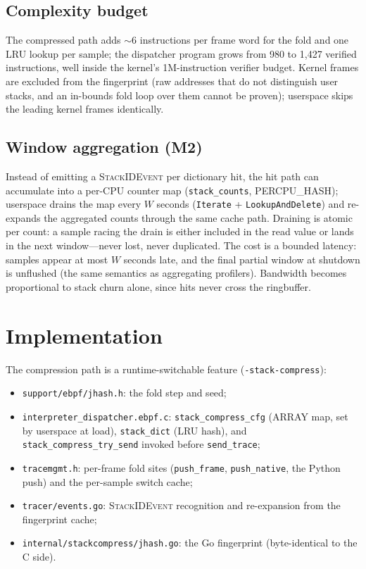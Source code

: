 \documentclass[letterpaper,twocolumn,10pt]{article}
\begin{document}
\subsection{Complexity budget}
The compressed path adds $\sim$6 instructions per frame word for the fold
and one LRU lookup per sample; the dispatcher program grows from 980 to
1{,}427 verified instructions, well inside the kernel's 1M-instruction
verifier budget. Kernel frames are excluded from the fingerprint (raw
addresses that do not distinguish user stacks, and an in-bounds fold loop
over them cannot be proven); userspace skips the leading kernel frames
identically.

\subsection{Window aggregation (M2)}
Instead of emitting a \textsc{StackIDEvent} per dictionary hit, the hit
path can accumulate into a per-CPU counter map
(\texttt{stack\_counts}, PERCPU\_HASH); userspace drains the map every
$W$ seconds (\texttt{Iterate} + \texttt{LookupAndDelete}) and re-expands
the aggregated counts through the same cache path. Draining is atomic per
count: a sample racing the drain is either included in the read value or
lands in the next window---never lost, never duplicated. The cost is a
bounded latency: samples appear at most $W$ seconds late, and the final
partial window at shutdown is unflushed (the same semantics as aggregating
profilers). Bandwidth becomes proportional to stack churn alone, since
hits never cross the ringbuffer.

\section{Implementation}
\label{sec:impl}
The compression path is a runtime-switchable feature
(\texttt{-stack-compress}):
\begin{itemize}
\item \texttt{support/ebpf/jhash.h}: the fold step and seed;
\item \texttt{interpreter\_dispatcher.ebpf.c}: \texttt{stack\_compress\_cfg}
(ARRAY map, set by userspace at load), \texttt{stack\_dict} (LRU hash), and
\texttt{stack\_compress\_try\_send} invoked before \texttt{send\_trace};
\item \texttt{tracemgmt.h}: per-frame fold sites (\texttt{push\_frame},
\texttt{push\_native}, the Python push) and the per-sample switch cache;
\item \texttt{tracer/events.go}: \textsc{StackIDEvent} recognition and
re-expansion from the fingerprint cache;
\item \texttt{internal/stackcompress/jhash.go}: the Go fingerprint
(byte-identical to the C side).
\end{itemize}
\end{document}
